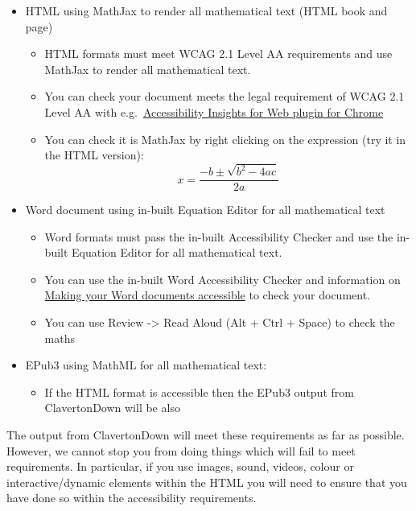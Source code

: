 \documentclass[
  17pt,
  a4paper]{extarticle}
\providecommand{\tightlist}{%
  \setlength{\itemsep}{0pt}\setlength{\parskip}{0pt}}
\theoremstyle{plain}
\theoremstyle{definition}
\theoremstyle{plain}
\theoremstyle{plain}
\theoremstyle{plain}
\theoremstyle{plain}
\theoremstyle{definition}
\theoremstyle{definition}
\theoremstyle{remark}
\theoremstyle{remark}
\renewcommand{\;}{\,}
\begin{document}
\begin{itemize}
\tightlist
\item
  HTML using MathJax to render all mathematical text (HTML book and page)

  \begin{itemize}
  \tightlist
  \item
    HTML formats must meet WCAG 2.1 Level AA requirements and use MathJax to render all mathematical text.
  \item
    You can check your document meets the legal requirement of WCAG 2.1 Level AA with e.g.~\href{https://accessibilityinsights.io/docs/en/web/overview}{Accessibility Insights for Web plugin for Chrome}
  \item
    You can check it is MathJax by right clicking on the expression (try it in the HTML version):
    \[x = \frac{-b\pm\sqrt{b^2 - 4ac}}{2a}\]
  \end{itemize}
\item
  Word document using in-built Equation Editor for all mathematical text

  \begin{itemize}
  \tightlist
  \item
    Word formats must pass the in-built Accessibility Checker and use the in-built Equation Editor for all mathematical text.
  \item
    You can use the in-built Word Accessibility Checker and information on \href{https://support.office.com/en-gb/article/make-your-word-documents-accessible-to-people-with-disabilities-d9bf3683-87ac-47ea-b91a-78dcacb3c66d}{Making your Word documents accessible} to check your document.
  \item
    You can use Review -\textgreater{} Read Aloud (Alt + Ctrl + Space) to check the maths
  \end{itemize}
\item
  EPub3 using MathML for all mathematical text:

  \begin{itemize}
  \tightlist
  \item
    If the HTML format is accessible then the EPub3 output from ClavertonDown will be also
  \end{itemize}
\end{itemize}

The output from ClavertonDown will meet these requirements as far as possible. However, we cannot stop you from doing things which will fail to meet requirements. In particular, if you use images, sound, videos, colour or interactive/dynamic elements within the HTML you will need to ensure that you have done so within the accessibility requirements.
\end{document}
